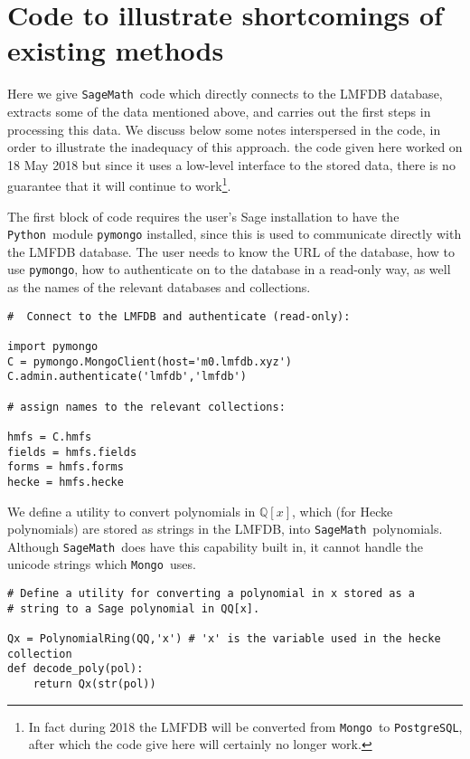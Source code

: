 \documentclass{llncs}
\def\Q{{\mathbb Q}}
\def\Sage{{\tt SageMath}}
\def\Python{{\tt Python}}
\def\Mongo{{\tt Mongo}}
\def\postgres{{\tt PostgreSQL}}
\begin{document}
\section{Code to illustrate shortcomings of existing methods}
Here we give \Sage\ code which directly connects to the LMFDB
database, extracts some of the data mentioned above, and carries out
the first steps in processing this data.  We discuss below some notes
interspersed in the code, in order to illustrate the inadequacy of
this approach.  the code given here worked on 18 May 2018 but since it
uses a low-level interface to the stored data, there is no guarantee
that it will continue to work\footnote{In fact during 2018 the LMFDB
  will be converted from \Mongo\ to \postgres, after which the code
  give here will certainly no longer work.}.

The first block of code requires the user's Sage installation to have
the \Python\ module {\tt pymongo} installed, since this is used to
communicate directly with the LMFDB database.  The user needs to know
the URL of the database, how to use {\tt pymongo}, how to authenticate
on to the database in a read-only way, as well as the names of the
relevant databases and collections.
\begin{verbatim}
#  Connect to the LMFDB and authenticate (read-only):

import pymongo
C = pymongo.MongoClient(host='m0.lmfdb.xyz')
C.admin.authenticate('lmfdb','lmfdb')

# assign names to the relevant collections:

hmfs = C.hmfs
fields = hmfs.fields
forms = hmfs.forms
hecke = hmfs.hecke

\end{verbatim}

We define a utility to convert polynomials in $\Q[x]$, which (for
Hecke polynomials) are stored as strings in the LMFDB, into
\Sage\ polynomials.  Although \Sage\ does have this capability built
in, it cannot handle the unicode strings which \Mongo\ uses.

\begin{verbatim}
# Define a utility for converting a polynomial in x stored as a
# string to a Sage polynomial in QQ[x].

Qx = PolynomialRing(QQ,'x') # 'x' is the variable used in the hecke collection
def decode_poly(pol):
    return Qx(str(pol))

\end{verbatim}
\end{document}
